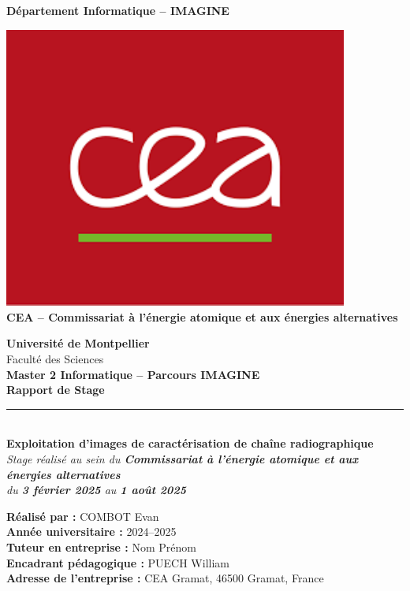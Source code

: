 \documentclass[12pt,a4paper]{report}
\begin{document}
\begin{titlepage}
\begin{center}
\begin{minipage}{0.3\textwidth}
    {\footnotesize\textbf{Département Informatique -- IMAGINE}}
\end{minipage}
\hfill
\begin{minipage}{0.3\textwidth}
    \centering
    \includegraphics[width=0.85\textwidth]{Assets/CEA.png}\\[0.2cm]
    {\footnotesize\textbf{CEA -- Commissariat à l'énergie atomique et aux énergies alternatives}}
\end{minipage}

\vspace{1.8cm}

{\Large \textbf{Université de Montpellier}}\\[0.2cm]
{\normalsize Faculté des Sciences}\\[0.3cm]
{\large \textbf{Master 2 Informatique -- Parcours \og IMAGINE \fg{}}}\\[1.5cm]

{\Huge \bfseries Rapport de Stage}\\[0.4cm]
\rule{0.65\linewidth}{0.7pt}\\[1cm]

{\large \textbf{Exploitation d'images de caractérisation de chaîne radiographique}}\\[0.5cm]
\textit{Stage réalisé au sein du \textbf{Commissariat à l'énergie atomique et aux énergies alternatives}}\\[0.3cm]
\textit{du \textbf{3 février 2025} au \textbf{1 août 2025}}\\[2cm]

\begin{flushleft}
\textbf{Réalisé par :} \hfill COMBOT Evan\\[0.15cm]
\textbf{Année universitaire :} \hfill 2024--2025\\[0.15cm]
\textbf{Tuteur en entreprise :} \hfill Nom Prénom\\[0.15cm]
\textbf{Encadrant pédagogique :} \hfill PUECH William\\[0.15cm]
\textbf{Adresse de l'entreprise :} \hfill CEA Gramat, 46500 Gramat, France
\end{flushleft}


\end{center}
\end{titlepage}
\end{document}
